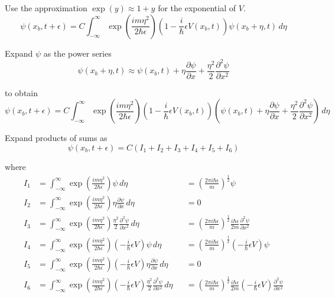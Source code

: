 Use the approximation $\exp(y)\approx1+y$ for the exponential of $V$.
\begin{equation*}
\psi(x_b,t+\epsilon)=C\int_{-\infty}^\infty
\exp\left(\frac{im\eta^2}{2\hbar\epsilon}\right)
\left(1-\frac{i}{\hbar}\epsilon V(x_b,t)\right)
\psi(x_b+\eta,t)\,d\eta
\end{equation*}

Expand $\psi$ as the power series
\begin{equation*}
\psi(x_b+\eta,t)\approx\psi(x_b,t)+\eta\frac{\partial\psi}{\partial x}
+\frac{\eta^2}{2}\frac{\partial^2\psi}{\partial x^2}
\end{equation*}

to obtain
\begin{equation*}
\psi(x_b,t+\epsilon)=C\int_{-\infty}^\infty
\exp\left(\frac{im\eta^2}{2\hbar\epsilon}\right)
\left(1-\frac{i}{\hbar}\epsilon V(x_b,t)\right)
\left(\psi(x_b,t)+\eta\frac{\partial\psi}{\partial x}
+\frac{\eta^2}{2}\frac{\partial^2\psi}{\partial x^2}\right)
\,d\eta
\end{equation*}

Expand products of sums as
\begin{equation*}
\psi(x_b,t+\epsilon)=C(I_1+I_2+I_3+I_4+I_5+I_6)
\end{equation*}

where
\begin{align*}
I_1&=\int_{-\infty}^\infty\exp\left(\frac{im\eta^2}{2\hbar\epsilon}\right)\psi
\,d\eta
& &=\left(\frac{2\pi i\hbar\epsilon}{m}\right)^\frac{1}{2}\psi
\\
I_2&=\int_{-\infty}^\infty
\exp\left(\frac{im\eta^2}{2\hbar\epsilon}\right)
\eta\frac{\partial\psi}{\partial x}
\,d\eta
& &=0
\\
I_3&=\int_{-\infty}^\infty
\exp\left(\frac{im\eta^2}{2\hbar\epsilon}\right)
\frac{\eta^2}{2}\frac{\partial^2\psi}{\partial x^2}
\,d\eta
& &=\left(\frac{2\pi i\hbar\epsilon}{m}\right)^\frac{1}{2}
\frac{i\hbar\epsilon}{2m}\frac{\partial^2\psi}{\partial x^2}
\\
I_4&=\int_{-\infty}^\infty
\exp\left(\frac{im\eta^2}{2\hbar\epsilon}\right)
\left(-\frac{i}{\hbar}\epsilon V\right)\psi
\,d\eta
& &=\left(\frac{2\pi i\hbar\epsilon}{m}\right)^\frac{1}{2}
\left(-\frac{i}{\hbar}\epsilon V\right)\psi
\\
I_5&=\int_{-\infty}^\infty
\exp\left(\frac{im\eta^2}{2\hbar\epsilon}\right)
\left(-\frac{i}{\hbar}\epsilon V\right)
\eta\frac{\partial\psi}{\partial x}
\,d\eta
& &=0
\\
I_6&=\int_{-\infty}^\infty
\exp\left(\frac{im\eta^2}{2\hbar\epsilon}\right)
\left(-\frac{i}{\hbar}\epsilon V\right)
\frac{\eta^2}{2}\frac{\partial^2\psi}{\partial x^2}
\,d\eta
& &=\left(\frac{2\pi i\hbar\epsilon}{m}\right)^\frac{1}{2}
\frac{i\hbar\epsilon}{2m}\left(-\frac{i}{\hbar}\epsilon V\right)
\frac{\partial^2\psi}{\partial x^2}
\end{align*}

